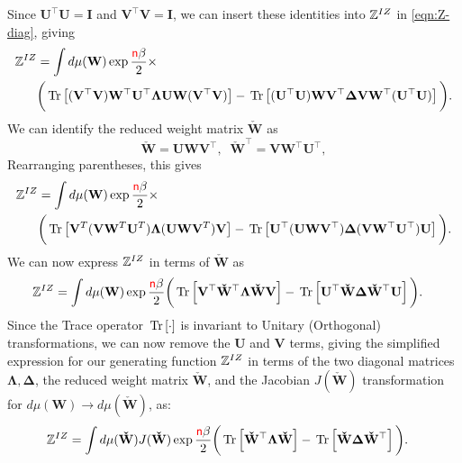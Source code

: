 Since $\mathbf{U}^{\top}\mathbf{U}=\mathbf{I}$ and $\mathbf{V}^{\top}\mathbf{V}=\mathbf{I}$,
%
we can insert these identities into $\mathbb{Z}^{IZ}$ in \ref{eqn:Z-diag}, giving
%
\begin{align}\label{eqn:Z0-diag}
\mathbb{Z}^{IZ} &= \int d\mu(\mathbf{W}) \exp\frac{{\color{red}\sf{n}}\beta}{2}\times  \\ \nonumber
&\bigg(\mbox{}\operatorname{Tr}\left[(\mathbf{V}^{\top}\mathbf{V})\mathbf{W}^{\top}\mathbf{U}^{\top}\mathbf{\Lambda}\mathbf{U}\mathbf{W}(\mathbf{V}^{\top}\mathbf{V})\right] 
-\mbox{}\operatorname{Tr}\left[(\mathbf{U}^{\top} \mathbf{U})\mathbf{W}\mathbf{V}^{\top} \mathbf{\Delta} \mathbf{V}\mathbf{W}^{\top}(\mathbf{U}^{\top} \mathbf{U})\right]\bigg)  .
\end{align}
We can identify the reduced weight matrix $\mathbf{\check{W}}$ as
\begin{equation}
   \label{eqn:Wcheck}
   \mathbf{\check{W}}=\mathbf{U}\mathbf{W}\mathbf{V}^{\top},\;\;
   \mathbf{\check{W}}^{\top}=\mathbf{V}\mathbf{W}^{\top}\mathbf{U}^{\top}  ,
\end{equation}
Rearranging parentheses, this gives 
\begin{align}
\mathbb{Z}^{IZ} &= \int d\mu(\mathbf{W}) \exp\frac{{\color{red}\sf{n}}\beta}{2}\times  \\ \nonumber
&\bigg(\mbox{}\operatorname{Tr}\left[\mathbf{V}^T(\mathbf{V}\mathbf{W}^T\mathbf{U}^T)\mathbf{\Lambda}(\mathbf{U}\mathbf{W}\mathbf{V}^T)\mathbf{V}\right]  
-\mbox{}\operatorname{Tr}\left[ \mathbf{U}^{\top}(\mathbf{U} \mathbf{W}\mathbf{V}^{\top})\mathbf{\Delta}(\mathbf{V}\mathbf{W}^{\top} \mathbf{U}^{\top})\mathbf{U} \right]\bigg)  .
\end{align}
We can now express $\mathbb{Z}^{IZ}$ in terms of $\mathbf{\check{W}}$ as
\begin{align}
\label{eqn:hciz-W-red}
\mathbb{Z}^{IZ} &= \int d\mu(\mathbf{W})\exp\frac{{\color{red}\sf{n}}\beta}{2}
 \bigg(\mbox{}\operatorname{Tr}\left[\mathbf{V}^{\top}\mathbf{\check{W}}^{\top}\mathbf{\Lambda}\mathbf{\check{W}}\mathbf{V}\right] 
 -\mbox{}\operatorname{Tr}\left[\mathbf{U}^{\top}\mathbf{\check{W}}\mathbf{\Delta}\mathbf{\check{W}}^{\top}\mathbf{U}\right]\bigg)  .
\end{align}
Since the Trace operator $\mbox{}\operatorname{Tr}\left[\cdot\right]$ is invariant to Unitary (Orthogonal) transformations, we can
now remove the
$\mathbf{U}$ and $\mathbf{V}$ terms, giving the simplified expression
for our generating function $\mathbb{Z}^{IZ}$ in terms of
the two diagonal matrices $\mathbf{\Lambda}, \mathbf{\Delta}$, 
the reduced weight matrix $\mathbf{\check{W}}$, and
the Jacobian $J(\mathbf{\check{W}})$ transformation for $d\mu(\mathbf{W})\rightarrow d\mu(\mathbf{\check{W}})$, as:
\begin{align}
\label{eqn:hciz-W-red2}
    \mathbb{Z}^{IZ} & =\int d\mu(\mathbf{\check{W}})J(\mathbf{\check{W}})\exp\frac{{\color{red}\sf{n}}\beta}{2}
 \bigg( \mbox{}\operatorname{Tr}\left[\mathbf{\check{W}}^{\top}\mathbf{\Lambda}\mathbf{\check{W}}\right] 
       -\mbox{}\operatorname{Tr}\left[\mathbf{\check{W}}\mathbf{\Delta} \mathbf{\check{W}}^{\top}\right] \bigg)  .
\end{align}


